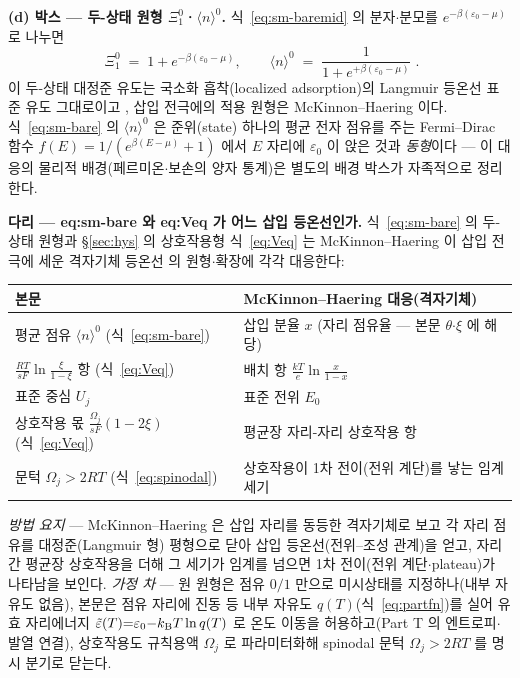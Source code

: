 \textbf{(d) 박스 --- 두-상태 원형 $\Xi_1^{0}$·$\langle n\rangle^{0}$.} 식~\eqref{eq:sm-baremid} 의
분자$\cdot$분모를 $e^{-\beta(\varepsilon_0-\mu)}$ 로 나누면
\begin{equation}
\boxed{\;\Xi_1^{0}\;=\;1+e^{-\beta(\varepsilon_0-\mu)},\qquad
\langle n\rangle^{0}\;=\;\frac{1}{1+e^{+\beta(\varepsilon_0-\mu)}}\;.}
\label{eq:sm-bare}
\end{equation}
이 두-상태 대정준 유도는 국소화 흡착(localized adsorption)의 Langmuir 등온선 표준 유도
그대로이고 \cite{hill1960,fowler1939}, 삽입 전극에의 적용 원형은 McKinnon--Haering
\cite{mckinnon1983} 이다. 식~\eqref{eq:sm-bare} 의 $\langle n\rangle^{0}$ 은 준위(state) 하나의 평균 전자 점유를
주는 Fermi--Dirac 함수 $f(E)=1/(e^{\beta(E-\mu)}+1)$ 에서 $E$ 자리에 $\varepsilon_0$ 이 앉은 것과
\emph{동형}이다 --- 이 대응의 물리적 배경(페르미온$\cdot$보손의 양자 통계)은 별도의 배경 박스가
자족적으로 정리한다.
\begin{srcbox}
\textbf{다리 --- eq:sm-bare 와 eq:Veq 가 어느 삽입 등온선인가.} 식~\eqref{eq:sm-bare} 의 두-상태 원형과
\S\ref{sec:hys} 의 상호작용형 식~\eqref{eq:Veq} 는 McKinnon--Haering 이 삽입 전극에 세운 격자기체
등온선\cite{mckinnon1983} 의 원형$\cdot$확장에 각각 대응한다:
\begin{center}\footnotesize
\begin{tabular}{@{}ll@{}}
\hline
본문 & McKinnon--Haering\cite{mckinnon1983} 대응(격자기체) \\
\hline
평균 점유 $\langle n\rangle^{0}$ (식~\eqref{eq:sm-bare}) & 삽입 분율 $x$ (자리 점유율 --- 본문 $\theta$$\cdot$$\xi$ 에 해당) \\
$\tfrac{RT}{sF}\ln\tfrac{\xi}{1-\xi}$ 항 (식~\eqref{eq:Veq}) & 배치 항 $\tfrac{kT}{e}\ln\tfrac{x}{1-x}$ \\
표준 중심 $U_j$ & 표준 전위 $E_0$ \\
상호작용 몫 $\tfrac{\Omega_j}{sF}(1-2\xi)$ (식~\eqref{eq:Veq}) & 평균장 자리-자리 상호작용 항 \\
문턱 $\Omega_j>2RT$ (식~\eqref{eq:spinodal}) & 상호작용이 1차 전이(전위 계단)를 낳는 임계 세기 \\
\hline
\end{tabular}
\end{center}
\emph{방법 요지} --- McKinnon--Haering 은 삽입 자리를 동등한 격자기체로 보고 각 자리 점유를 대정준(Langmuir
형) 평형으로 닫아 삽입 등온선(전위--조성 관계)을 얻고, 자리 간 평균장 상호작용을 더해 그 세기가 임계를
넘으면 1차 전이(전위 계단$\cdot$plateau)가 나타남을 보인다. \emph{가정 차} --- 원 원형은 점유 $0/1$ 만으로
미시상태를 지정하나(내부 자유도 없음), 본문은 점유 자리에 진동 등 내부 자유도 $q(T)$(식~\eqref{eq:partfn})를
실어 유효 자리에너지 $\tilde\varepsilon(T){=}\varepsilon_0{-}k_{\mathrm B} T\ln q(T)$ 로 온도 이동을 허용하고(Part T 의
엔트로피$\cdot$발열 연결), 상호작용도 규칙용액 $\Omega_j$ 로 파라미터화해 spinodal 문턱 $\Omega_j{>}2RT$ 를
명시 분기로 닫는다.
\end{srcbox}

